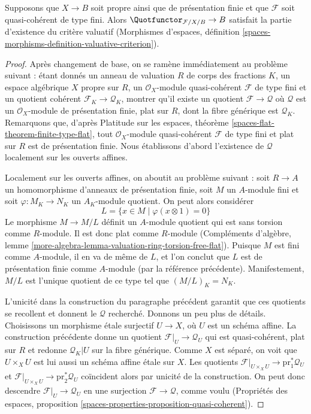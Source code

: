 \begin{lemma}
\label{lemma-quot-existence-part}
Supposons que $X \to B$ soit propre ainsi que de présentation finie et que
$\mathcal{F}$ soit quasi-cohérent de type fini.
Alors $\Quotfunctor_{\mathcal{F}/X/B} \to B$ satisfait la partie
d'existence du critère valuatif (Morphismes d'espaces, définition
\ref{spaces-morphisms-definition-valuative-criterion}).
\end{lemma}

\begin{proof}
Après changement de base, on se ramène immédiatement au problème suivant :
étant donnés un anneau de valuation $R$ de corps des fractions $K$, un
espace algébrique $X$ propre sur $R$, un $\mathcal{O}_X$-module
quasi-cohérent $\mathcal{F}$ de type fini et un quotient cohérent
$\mathcal{F}_K \to \mathcal{Q}_K$, montrer qu'il existe un quotient
$\mathcal{F} \to \mathcal{Q}$ où $\mathcal{Q}$ est un
$\mathcal{O}_X$-module de présentation finie, plat sur $R$, dont la fibre
générique est $\mathcal{Q}_K$.
Remarquons que, d'après Platitude sur les espaces, théorème
\ref{spaces-flat-theorem-finite-type-flat}, tout $\mathcal{O}_X$-module
quasi-cohérent $\mathcal{F}$ de type fini et plat sur $R$ est de
présentation finie. Nous établissons d'abord l'existence de $\mathcal{Q}$
localement sur les ouverts affines.

\medskip\noindent
Localement sur les ouverts affines, on aboutit au problème suivant :
soit $R \to A$ un homomorphisme d'anneaux de présentation finie, soit $M$
un $A$-module fini et soit $\varphi : M_K \to N_K$ un $A_K$-module
quotient. On peut alors considérer
$$
L = \{x \in M \mid \varphi(x \otimes 1) = 0 \}
$$
Le morphisme $M \to M/L$ définit un $A$-module quotient qui est sans
torsion comme $R$-module. Il est donc plat comme $R$-module (Compléments
d'algèbre, lemme
\ref{more-algebra-lemma-valuation-ring-torsion-free-flat}).
Puisque $M$ est fini comme $A$-module, il en va de même de $L$, et l'on
conclut que $L$ est de présentation finie comme $A$-module (par la
référence précédente). Manifestement, $M/L$ est l'unique quotient de ce
type tel que $(M/L)_K = N_K$.

\medskip\noindent
L'unicité dans la construction du paragraphe précédent garantit que ces
quotients se recollent et donnent le $\mathcal{Q}$ recherché. Donnons un
peu plus de détails. Choisissons un morphisme \'etale surjectif
$U \to X$, où $U$ est un schéma affine. La construction précédente donne
un quotient $\mathcal{F}|_U \to \mathcal{Q}_U$ qui est quasi-cohérent,
plat sur $R$ et redonne $\mathcal{Q}_K|U$ sur la fibre générique.
Comme $X$ est séparé, on voit que $U \times_X U$ est lui aussi un schéma
affine \'etale sur $X$.
Les quotients $\mathcal{F}|_{U \times_X U} \to
\text{pr}_1^*\mathcal{Q}_U$ et
$\mathcal{F}|_{U \times_X U} \to \text{pr}_2^*\mathcal{Q}_U$
coïncident alors par unicité de la construction. On peut donc descendre
$\mathcal{F}|_U \to \mathcal{Q}_U$ en une surjection
$\mathcal{F} \to \mathcal{Q}$, comme voulu (Propriétés des espaces,
proposition \ref{spaces-properties-proposition-quasi-coherent}).
\end{proof}

